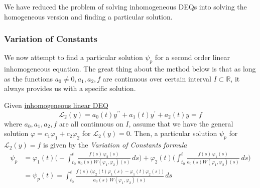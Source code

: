 \documentclass{article}
\newcounter{theorem}[section]
\begin{document}
    We have reduced the problem of solving inhomogeneous DEQs into solving the homogeneous version and finding a particular solution. 

    \subsubsection{Variation of Constants}

      We now attempt to find a particular solution $\psi_p$ for a second order linear inhomogeneous equation. The great thing about the method below is that as long as the functions $a_0 \neq 0, a_1, a_2, f$ are continuous over certain interval $I \subset \mathbb{R}$, it always provides us with a specific solution. 

      \begin{theorem}
        \label{thm:variation-of-constants-formula-for-2nd-order}
      Given \hyperref[def:inhomogeneous-linear-deq]{inhomogeneous linear DEQ}
      \begin{equation}
        \mathcal{L}_2(y) = a_0 (t) y^{\prime \prime} + a_1 (t) y^\prime + a_2 (t) y = f
      \end{equation}
      where $a_0, a_1, a_2, f$ are all continuous on $I$, assume that we have the general solution $\varphi = c_1 \varphi_1 + c_2 \varphi_2$ for $\mathcal{L}_2(y) = 0$. Then, a particular solution $\psi_p$ for $\mathcal{L}_2 (y) = f$ is given by the \textit{Variation of Constants formula} 
      \begin{align*}
          \psi_p & = \varphi_1 (t) \Bigg( - \int_{t_0}^t \frac{f(s)\,\varphi_2 (s)}{ a_0 (s) W(\varphi_1, \varphi_2) (s)}\,ds \Bigg) + \varphi_2 (t) \Bigg( \int_{t_0}^t \frac{f(s)\,\varphi_1 (s)}{ a_0 (s) W(\varphi_1, \varphi_2) (s)}\,ds \Bigg) \\
          & = \psi_p (t) = \int_{t_0}^t \frac{f(s) \, \big( \varphi_2 (t) \varphi_1 (s) - \varphi_1(t) \varphi_2 (s)\big)}{a_0 (s) \, W(\varphi_1, \varphi_2) (s)}\,ds
      \end{align*}
      \end{theorem}
\end{document}
